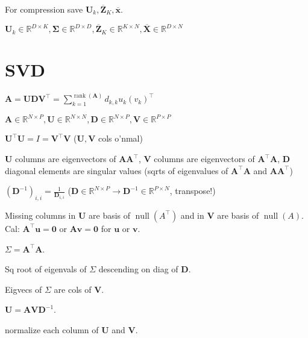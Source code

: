 \documentclass[a4paper, 11pt, landscape]{article}
\newenvironment{inlinelist}%
{\begin{enumerate*}[label=\textbf{\color{red}\theenumi.}]}%
{\end{enumerate*}}
\begin{document}
\begin{multicols*}{3}
\begin{compactitem}
	\item For compression save $\mathbf{U}_k, \overline{\mathbf{Z}}_K, \overline{\mathbf{x}}$.
	\item $\mathbf{U}_k \in \mathbb{R}^{D \times K}, \boldsymbol{\Sigma} \in \mathbb{R}^{D \times D}, \overline{\mathbf{Z}}_K \in \mathbb{R}^{K \times N}, \overline{\mathbf{X}} \in \mathbb{R}^{D \times N}$
\end{compactitem}

\section{SVD}
\begin{inparaitem}
	\item $\mathbf{A} = \mathbf{U} \mathbf{D} \mathbf{V}^\top = \sum_{k=1}^{\operatorname{rank}(\mathbf{A})} d_{k,k} u_k (v_k)^\top$
	\item $\mathbf{A} \in \mathbb{R}^{N \times P}, \mathbf{U} \in \mathbb{R}^{N \times N}, \mathbf{D} \in \mathbb{R}^{N \times P}, \mathbf{V} \in \mathbb{R}^{P \times P}$
	\item $\mathbf{U}^\top \mathbf{U} = I = \mathbf{V}^\top \mathbf{V}$ ($\mathbf{U}, \mathbf{V}$ cols o'nmal)
	\item $\mathbf{U}$ columns are eigenvectors of $\mathbf{A} \mathbf{A}^\top$, $\mathbf{V}$ columns are eigenvectors of $\mathbf{A}^\top \mathbf{A}$, $\mathbf{D}$ diagonal elements are singular values (sqrts of eigenvalues of $\mathbf{A}^\top \mathbf{A}$ and $\mathbf{A} \mathbf{A}^\top$)
	\item $(\mathbf{D}^{-1})_{i,i} = \frac{1}{\mathbf{D}_{i, i}}$ ($\mathbf{D} \in \mathbb{R}^{N \times P} \to \mathbf{D}^{-1} \in \mathbb{R}^{P \times N}$, transpose!)
	\item Missing columns in $\mathbf{U}$ are basis of $\operatorname{null}(A^\top)$ and in $\mathbf{V}$ are basis of $\operatorname{null}(A)$. Cal: $\mathbf{A}^\top \mathbf{u} = \mathbf{0}$ or $\mathbf{A} \mathbf{v} = \mathbf{0}$ for $\mathbf{u}$ or $\mathbf{v}$.
\end{inparaitem}

\begin{inlinelist}
	\item $\Sigma = \mathbf{A}^\top \mathbf{A}$.
	\item Sq root of eigenvals of $\Sigma$ descending on diag of $\mathbf{D}$.
	\item Eigvecs of $\Sigma$ are cols of $\mathbf{V}$.
	\item $\mathbf{U} = \mathbf{A} \mathbf{V} \mathbf{D}^{-1}$.
	\item normalize each column of $\mathbf{U}$ and $\mathbf{V}$.
\end{inlinelist}


\end{multicols*}
\end{document}
